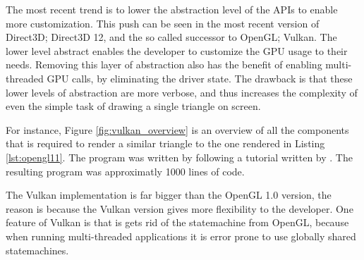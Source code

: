 The most recent trend is to lower the abstraction level of the \glspl{API} to enable more customization.
This push can be seen in the most recent version of Direct3D; Direct3D 12, and the so called successor to OpenGL; Vulkan.
The lower level abstract enables the developer to customize the \gls{GPU} usage to their needs.
Removing this layer of abstraction also has the benefit of enabling multi-threaded \gls{GPU} calls, by eliminating the driver state.
The drawback is that these lower levels of abstraction are more verbose, and thus increases the complexity of even the simple task of drawing a single triangle on screen.

For instance, Figure \ref{fig:vulkan_overview} is an overview of all the components that is required to render a similar triangle to the one rendered in Listing \ref{lst:opengl11}.
The program was written by following a tutorial written by \citet{overvoorde2017vulkan}.
The resulting program was approximatly 1000 lines of code.


The Vulkan implementation is far bigger than the OpenGL 1.0 version, the reason is because the Vulkan version gives more flexibility to the developer.
One feature of Vulkan is that is gets rid of the statemachine from OpenGL, because when running multi-threaded applications it is error prone to use globally shared statemachines.